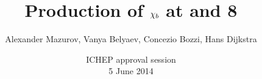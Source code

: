 \title{Production of $\chi_{b}$ at  and 8\tev}
\author{Alexander Mazurov, Vanya Belyaev, Concezio Bozzi, Hans Dijkstra}
\date{ICHEP approval session\\5 June 2014}
